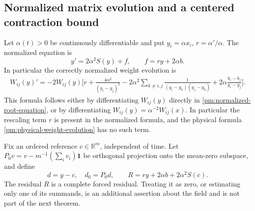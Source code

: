 \subsection{Normalized matrix evolution and a centered contraction bound}
\label{pm:normalized-subsection}

Let \(\alpha(t)>0\) be continuously differentiable and put
\(y_i=\alpha x_i\), \(r=\alpha'/\alpha\).  The normalized equation is
\begin{equation}
 y'=2\alpha^2S(y)+f,\qquad f=ry+2\alpha b.
 \label{pm:normalized-root-equation}
\end{equation}
In particular the correctly normalized weight evolution is
\begin{align}
 W_{ij}(y)'
  =-2W_{ij}(y)\biggl[
      r+\frac{4\alpha^2}{(y_i-y_j)^2}
       -2\alpha^2\sum_{k\ne i,j}
          \frac1{(y_i-y_k)(y_j-y_k)}
       +2\alpha\frac{b_i-b_j}{y_i-y_j}\biggr].
 \label{pm:normalized-weight-evolution}
\end{align}
This formula follows either by differentiating \(W_{ij}(y)\) directly
in \eqref{pm:normalized-root-equation}, or by differentiating
\(W_{ij}(y)=\alpha^{-2}W_{ij}(x)\).  In particular the rescaling term
\(r\) is present in the normalized formula, and the physical formula
\eqref{pm:physical-weight-evolution} has no such term.

Fix an ordered reference \(c\in\mathbb R^m\), independent of time.
Let \(P_0v=v-m^{-1}(\sum_i v_i)\mathbf 1\) be orthogonal projection
onto the mean-zero subspace, and define
\begin{equation}
 d=y-c,\quad d_0=P_0d,\qquad
 R=ry+2\alpha b+2\alpha^2S(c).
 \label{pm:centered-residual}
\end{equation}
The residual \(R\) is a complete forced residual.  Treating it as zero,
or estimating only one of its summands, is an additional assertion about
the field and is not part of the next theorem.

